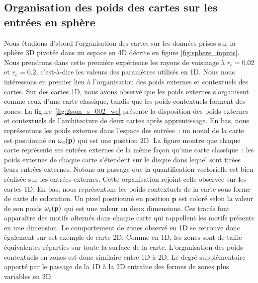 \documentclass[../main]{subfiles}
\begin{document}
\subsection{Organisation des poids des cartes sur les entrées en sphère \label{par:orga2D}}

Nous étudions d'abord l'organisation des cartes sur les données prises sur la sphère 3D pivotée dans un espace en 4D décrite en figure \ref{fig:sphere_inputs}. Nous prendrons dans cette première expérience les rayons de voisinage à $r_c = 0.02$ et $r_e = 0.2$, c'est-à-dire les valeurs des paramètres utilisés en 1D.
Nous nous intéressons en premier lieu à l'organisation des poids externes et contextuels des cartes. Sur des cartes 1D, nous avons observé que les poids externes s'organisent comme ceux d'une carte classique, tandis que les poids contextuels forment des zones.
La figure~\ref{fig:2som_s_002_wc} présente la disposition des poids externes et contextuels de l'architecture de deux cartes après apprentissage.
En bas, nous représentons les poids externes dans l'espace des entrées~: un n\oe{}ud de la carte est positionné en $\omega_e(\mathbf{p})$ qui est une position 2D.
La figure montre que chaque carte représente ses entrées externes de la même façon qu'une carte classique~: les poids externes de chaque carte s'étendent sur le disque dans lequel sont tirées leurs entrées externes. Notons au passage que la quantification vectorielle est bien réalisée sur les entrées externes. Cette organisation rejoint celle observée sur les cartes 1D.
En bas, nous représentons les poids contextuels de la carte sous forme de carte de coloration. Un pixel positionné en position $\mathbf{p}$ est coloré selon la valeur de son poids $\omega_c(\mathbf{p})$ qui est une valeur en deux dimensions.
Ces tracés font apparaître des motifs alternés dans chaque carte qui rappellent les motifs présents en une dimension. Le comportement de zones observé en 1D se retrouve donc également sur cet exemple de carte 2D.
Comme en 1D, les zones sont de taille équivalentes réparties sur toute la surface de la carte. L'organisation des poids contextuels en zones est donc similaire entre 1D à 2D. Le degré supplémentaire apporté par le passage de la 1D à la 2D entraîne des formes de zones plus variables en 2D.
\end{document}
